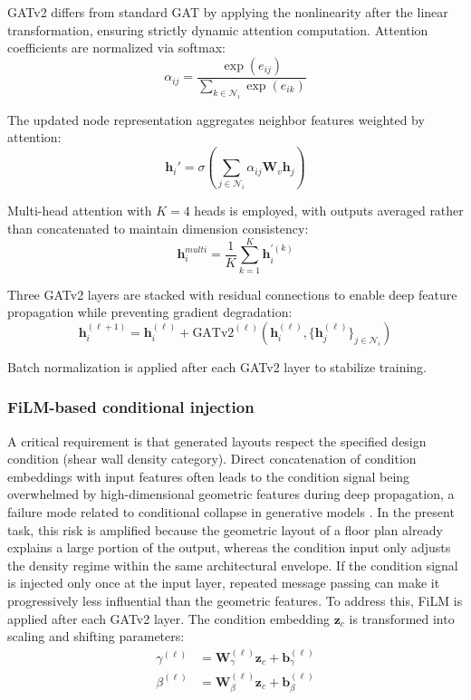 GATv2 differs from standard GAT by applying the nonlinearity after the linear transformation, ensuring strictly dynamic attention computation. Attention coefficients are normalized via softmax:
\begin{equation}
\alpha_{ij} = \frac{\exp(e_{ij})}{\sum_{k \in \mathcal{N}_i} \exp(e_{ik})}
\label{eq:method_gat_attn_softmax}
\end{equation}

The updated node representation aggregates neighbor features weighted by attention:
\begin{equation}
\mathbf{h}_i' = \sigma\left(\sum_{j \in \mathcal{N}_i} \alpha_{ij} \mathbf{W}_v \mathbf{h}_j\right)
\label{eq:method_gat_update}
\end{equation}

Multi-head attention with $K=4$ heads is employed, with outputs averaged rather than concatenated to maintain dimension consistency:
\begin{equation}
\mathbf{h}_i^{multi} = \frac{1}{K}\sum_{k=1}^{K} \mathbf{h}_i^{'(k)}
\label{eq:method_multihead_avg}
\end{equation}

Three GATv2 layers are stacked with residual connections to enable deep feature propagation while preventing gradient degradation:
\begin{equation}
\mathbf{h}_i^{(\ell+1)} = \mathbf{h}_i^{(\ell)} + \text{GATv2}^{(\ell)}(\mathbf{h}_i^{(\ell)}, \{\mathbf{h}_j^{(\ell)}\}_{j \in \mathcal{N}_i})
\label{eq:method_residual_gat}
\end{equation}


Batch normalization is applied after each GATv2 layer to stabilize training.

\subsubsection{FiLM-based conditional injection}

A critical requirement is that generated layouts respect the specified design condition (shear wall density category).
Direct concatenation of condition embeddings with input features often leads to the condition signal being overwhelmed by high-dimensional geometric features during deep propagation, a failure mode related to conditional collapse in generative models \cite{lucasUnderstandingPosteriorCollapse2019}. In the present task, this risk is amplified because the geometric layout of a floor plan already explains a large portion of the output, whereas the condition input only adjusts the density regime within the same architectural envelope. If the condition signal is injected only once at the input layer, repeated message passing can make it progressively less influential than the geometric features. To address this, FiLM is applied after each GATv2 layer.
The condition embedding $\mathbf{z}_c$ is transformed into scaling and shifting parameters:
\begin{align}
\gamma^{(\ell)} &= \mathbf{W}_\gamma^{(\ell)} \mathbf{z}_c + \mathbf{b}_\gamma^{(\ell)} \\
\beta^{(\ell)} &= \mathbf{W}_\beta^{(\ell)} \mathbf{z}_c + \mathbf{b}_\beta^{(\ell)}
\end{align}

